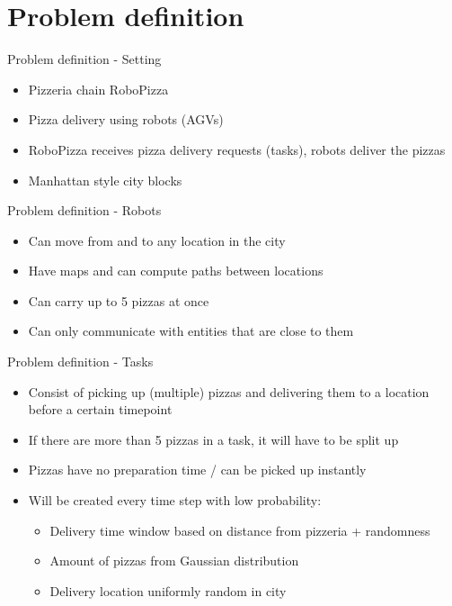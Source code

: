 \section{Problem definition}

\begin{frame}{Problem definition - Setting}
    \begin{itemize}
        \item Pizzeria chain RoboPizza
        \item Pizza delivery using robots (AGVs)
        \item RoboPizza receives pizza delivery requests (tasks), robots deliver the pizzas
        \item Manhattan style city blocks
    \end{itemize}
\end{frame}

\begin{frame}{Problem definition - Robots}
    \begin{itemize}
        \item Can move from and to any location in the city
        \item Have maps and can compute paths between locations
        \item Can carry up to 5 pizzas at once
        \item Can only communicate with entities that are close to them
    \end{itemize}
\end{frame}

\begin{frame}{Problem definition - Tasks}
    \begin{itemize}
        \item Consist of picking up (multiple) pizzas and delivering them to a location before a certain timepoint
        \item If there are more than 5 pizzas in a task, it will have to be split up
        \item Pizzas have no preparation time / can be picked up instantly
        \item Will be created every time step with low probability:
            \begin{itemize}
                \item Delivery time window based on distance from pizzeria + randomness
                \item Amount of pizzas from Gaussian distribution
                \item Delivery location uniformly random in city
            \end{itemize}
    \end{itemize}
\end{frame}

